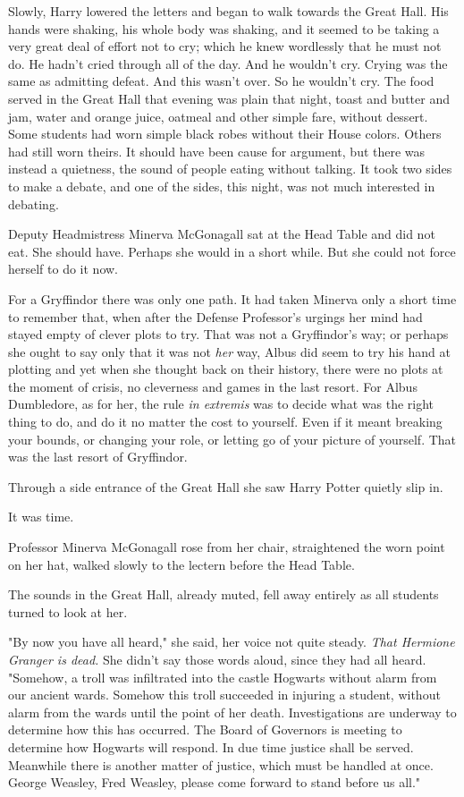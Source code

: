 Slowly, Harry lowered the letters and began to walk towards the Great Hall. His
hands were shaking, his whole body was shaking, and it seemed to be taking a
very great deal of effort not to cry; which he knew wordlessly that he must not
do. He hadn't cried through all of the day. And he wouldn't cry. Crying was the
same as admitting defeat. And this wasn't over. So he wouldn't cry.
\sbreak
The food served in the Great Hall that evening was plain that night, toast and
butter and jam, water and orange juice, oatmeal and other simple fare, without
dessert. Some students had worn simple black robes without their House colors.
Others had still worn theirs. It should have been cause for argument, but there
was instead a quietness, the sound of people eating without talking. It took
two sides to make a debate, and one of the sides, this night, was not much
interested in debating.

Deputy Headmistress Minerva McGonagall sat at the Head Table and did not eat.
She should have. Perhaps she would in a short while. But she could not force
herself to do it now.

For a Gryffindor there was only one path. It had taken Minerva only a short
time to remember that, when after the Defense Professor's urgings her mind had
stayed empty of clever plots to try. That was not a Gryffindor's way; or
perhaps she ought to say only that it was not \emph{her} way, Albus did seem to
try his hand at plotting{\el} and yet when she thought back on their
history, there were no plots at the moment of crisis, no cleverness and games
in the last resort. For Albus Dumbledore, as for her, the rule \emph{in
extremis} was to decide what was the right thing to do, and do it no matter the
cost to yourself. Even if it meant breaking your bounds, or changing your role,
or letting go of your picture of yourself. That was the last resort of
Gryffindor.

Through a side entrance of the Great Hall she saw Harry Potter quietly slip in.

It was time.

Professor Minerva McGonagall rose from her chair, straightened the worn point
on her hat, walked slowly to the lectern before the Head Table.

The sounds in the Great Hall, already muted, fell away entirely as all students
turned to look at her.

"By now you have all heard," she said, her voice not quite steady. \emph{That
Hermione Granger is dead.} She didn't say those words aloud, since they had all
heard. "Somehow, a troll was infiltrated into the castle Hogwarts without alarm
from our ancient wards. Somehow this troll succeeded in injuring a student,
without alarm from the wards until the point of her death. Investigations are
underway to determine how this has occurred. The Board of Governors is meeting
to determine how Hogwarts will respond. In due time justice shall be served.
Meanwhile there is another matter of justice, which must be handled at once.
George Weasley, Fred Weasley, please come forward to stand before us all."

